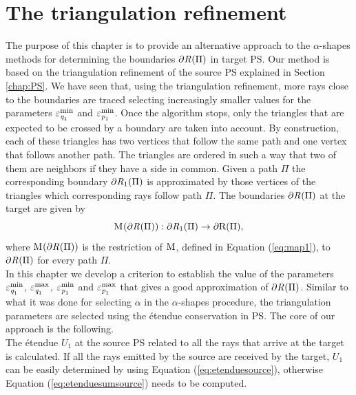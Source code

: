 \chapter{The triangulation refinement}\label{chap:triangulation}
The purpose of this chapter is to provide an alternative approach to the $\alpha$-shapes methods for determining the boundaries $\partial \mbox{$\emph{R}_{\textit{}}$}(\Pi)$ in target PS. 
Our method is based on the triangulation refinement of the source PS explained in Section \ref{chap:PS}.
We have seen that, using the triangulation refinement, more rays close to the boundaries are traced selecting increasingly smaller values for the parameters $\varepsilon_{\textit{q}_1}^{\textrm{min}}$ and $\varepsilon_{\textit{p}_1}^{\textrm{min}}$. Once the algorithm stops, only the triangles that are expected to be crossed by a boundary are taken into account. By construction, each of these triangles has two vertices that follow the same path and one vertex that follows another path.
The triangles are ordered in such a way that two of them are neighbors if they have a side in common. Given a path $\Pi$ the corresponding boundary $\partial\mbox{$\emph{R}_{\textit{$1$}}$}(\Pi)$ is approximated by those vertices of the triangles which corresponding rays follow path $\Pi$.
The boundaries $\partial \mbox{$\emph{R}_{\textit{}}$}(\Pi)$ at the target are given by
\begin{equation}\mathrm{M}_{\textit{}}(\partial\mbox{$\emph{R}_{\textit{}}$}(\Pi)):\partial\mbox{$\emph{R}_{\textit{$1$}}$}(\Pi)\rightarrow\partial\mbox{{R}{}{}}(\Pi),\end{equation}
where $\mathrm{M}_{\textit{}}(\partial\mbox{$\emph{R}_{\textit{}}$}(\Pi))$ is the restriction of $\mathrm{M}_{\textit{}}$, defined in Equation (\ref{eq:map1}), to $\partial\mbox{$\emph{R}_{\textit{}}$}(\Pi)$ for every path 
$\Pi$. \\\indent In this chapter we develop a criterion to establish the value of the parameters $\varepsilon_{\textit{q}_1}^{\textrm{min}}$, $\varepsilon_{\textit{q}_1}^{\textrm{max}}$, $\varepsilon_{\textit{p}_1}^{\textrm{min}}$ and $\varepsilon_{\textit{p}_1}^{\textrm{max}}$ that gives a good approximation of $\partial \mbox{$\emph{R}_{\textit{}}$}(\Pi)$.
 Similar to what it was done for selecting $\alpha$ in the $\alpha$-shapes procedure, 
the triangulation parameters are selected using the \'{e}tendue conservation in PS. The core of our approach is the following.\\
\indent The \'{e}tendue $U_1$ at the source PS  related to all the rays that arrive at the target is calculated. If all the rays emitted by the source are received by the target, $U_1$ can be easily determined by using Equation (\ref{eq:etenduesource}), otherwise Equation (\ref{eq:etenduesumsource}) needs to be computed. 
